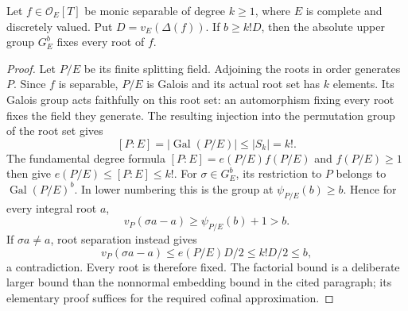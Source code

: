 \begin{lemma}
\label{fw:separable-splitting-upper-bound}
\leanok
Let $f\in\mathcal O_E[T]$ be monic separable of degree $k\geq1$,
where $E$ is complete and discretely valued. Put
$D=v_E(\Delta(f))$. If $b\geq k!D$, then the absolute upper group
$G_E^b$ fixes every root of $f$.
\end{lemma}
\begin{proof}
Let $P/E$ be its finite splitting field. Adjoining the roots in order
generates $P$. Since $f$ is separable, $P/E$ is Galois and its actual
root set has $k$ elements. Its Galois group acts faithfully on this
root set: an automorphism fixing every root fixes the field they
generate. The resulting injection into the permutation group of the
root set gives
\[
 [P:E]=|\operatorname{Gal}(P/E)|\leq |S_k|=k!.
\]
The fundamental degree formula $[P:E]=e(P/E)f(P/E)$ and $f(P/E)\geq1$
then give $e(P/E)\leq[P:E]\leq k!$.
For $\sigma\in G_E^b$, its restriction to $P$ belongs to
$\operatorname{Gal}(P/E)^b$. In lower numbering this is the group
at $\psi_{P/E}(b)\geq b$. Hence for every integral root $a$,
\[
 v_P(\sigma a-a)\geq\psi_{P/E}(b)+1>b.
\]
If $\sigma a\ne a$, root separation instead gives
\[
 v_P(\sigma a-a)\leq e(P/E)D/2\leq k!D/2\leq b,
\]
a contradiction. Every root is therefore fixed. The factorial bound
is a deliberate larger bound than the nonnormal embedding bound in
the cited paragraph; its elementary proof suffices for the required
cofinal approximation.
\end{proof}

